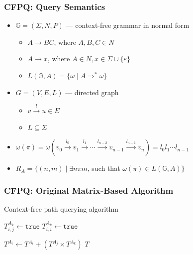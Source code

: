 \documentclass[xcolor=table]{beamer}
\begin{document}
  \begin{frame}[fragile]
    \frametitle{CFPQ: Query Semantics}
    \begin{itemize}
      \item $\mathbb{G} = (\Sigma, N, P)$ --- context-free grammar in normal form
      \begin{itemize}
        \item $A \rightarrow B C$, where $A, B, C \in N$
        \item $A \rightarrow x$, where $A \in N, x \in \Sigma \cup \{\varepsilon\}$
        \item $L(\mathbb{G},A) = \{ \omega \mid A \Rightarrow^* \omega \}$
      \end{itemize}
      \pause
      \item $G = (V,E,L)$ --- directed graph
        \begin{itemize}
          \item $v \xrightarrow{l} u \in E$
          \item $L \subseteq \Sigma$
        \end{itemize}
        \pause
      \item $\omega(\pi) = \omega(v_0 \xrightarrow{l_0} v_1 \xrightarrow{l_1} \cdots \xrightarrow{l_{n-2}} v_{n-1} \xrightarrow{l_{n-1}} v_n) = l_0 l_1 \cdots l_{n-1}$
      \pause
      \item $R_A = \{ (n, m) \mid \exists n \pi m$, such that $\omega(\pi) \in L(\mathbb{G},A)\}$
    \end{itemize}
  \end{frame}

  \begin{frame}[fragile] \frametitle{CFPQ: Original Matrix-Based Algorithm}
    	\begin{algorithm}[H]
    		\begin{algorithmic}[1]
    			\caption{Context-free path querying algorithm}
    			\label{lst:algo1}
    			{$T^{A_k}_{i,j} \gets \texttt{true}$}
    			\EndFor
    			{$T^{A_k}_{i,i} \gets \texttt{true}$}
    			\EndFor
    			\EndFor
    			
    			{ $T^{A_i} \gets T^{A_i} + (T^{A_j} \times T^{A_k})$ } 
    			\EndFor
    			\EndWhile
    			\State \Return $T$
    			\EndFunction
    		\end{algorithmic}
    	\end{algorithm}
  \end{frame}
\end{document}
